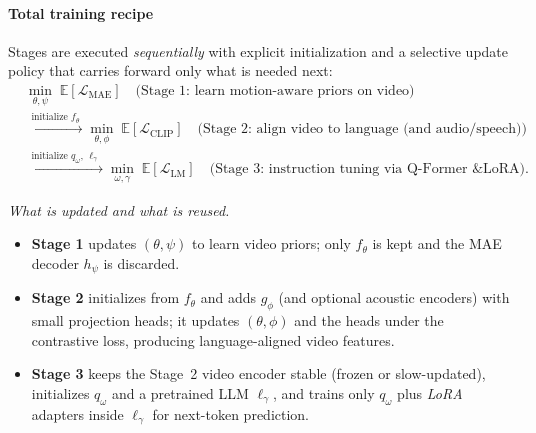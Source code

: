 \begin{enrichment}
\begin{enrichment}
        \paragraph{Total training recipe}
        Stages are executed \emph{sequentially} with explicit initialization and a selective update policy that carries forward only what is needed next:
        \begin{equation}
            \begin{aligned}
                &\min_{\theta,\psi}\; \mathbb{E}\!\left[\mathcal{L}_{\text{MAE}}\right]
                \quad \text{(Stage 1: learn motion-aware priors on video)}\\[4pt]
                &\xrightarrow{\;\text{initialize } f_\theta\;}
                \min_{\theta,\phi}\; \mathbb{E}\!\left[\mathcal{L}_{\text{CLIP}}\right]
                \quad \text{(Stage 2: align video to language (and audio/speech))}\\[4pt]
                &\xrightarrow{\;\text{initialize } q_\omega,\, \ell_\gamma\;}
                \min_{\omega,\gamma}\; \mathbb{E}\!\left[\mathcal{L}_{\text{LM}}\right]
                \quad \text{(Stage 3: instruction tuning via Q-Former \& LoRA).}
            \end{aligned}
            \label{eq:chapter24_iv2_total}
        \end{equation}
        
        \noindent\textit{What is updated and what is reused.}
        \begin{itemize}
            \item \textbf{Stage 1} updates $(\theta,\psi)$ to learn video priors; only $f_\theta$ is kept and the MAE decoder $h_\psi$ is discarded.
            \item \textbf{Stage 2} initializes from $f_\theta$ and adds $g_\phi$ (and optional acoustic encoders) with small projection heads; it updates $(\theta,\phi)$ and the heads under the contrastive loss, producing language-aligned video features.
            \item \textbf{Stage 3} keeps the Stage~2 video encoder stable (frozen or slow-updated), initializes $q_\omega$ and a pretrained LLM $\ell_\gamma$, and trains only $q_\omega$ plus \emph{LoRA} adapters inside $\ell_\gamma$ for next-token prediction.
        \end{itemize}
        

\end{enrichment}
\end{enrichment}
